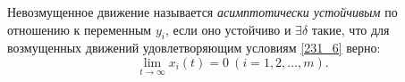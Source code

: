 \begin{to_def}
	Невозмущенное движение называется \textit{асимптотически устойчивым} по отношению к переменным $y_i$, если оно устойчиво и $\exists \delta$ такие, что для возмущенных движений удовлетворяющим условиям \eqref{231_6} верно:
	\begin{equation}
		\lim_{t \to \infty} x_i (t) = 0 \ (i = 1, 2, \ldots, m).
		\label{231_8}
	\end{equation}
\end{to_def}
